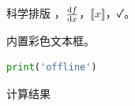 \documentclass{ctexart}
\begin{document}
科学排版 ，$\dv{f}{x}$，$\llbracket x\rrbracket$，\faCheck。
\begin{tcolorbox}[breakable,title=中文提示]内置彩色文本框。\end{tcolorbox}
\begin{lstlisting}[language=Python]
print('offline')
\end{lstlisting}
\begin{algorithm}[H]计算结果\;\caption{离线算法}\end{algorithm}
\end{document}
